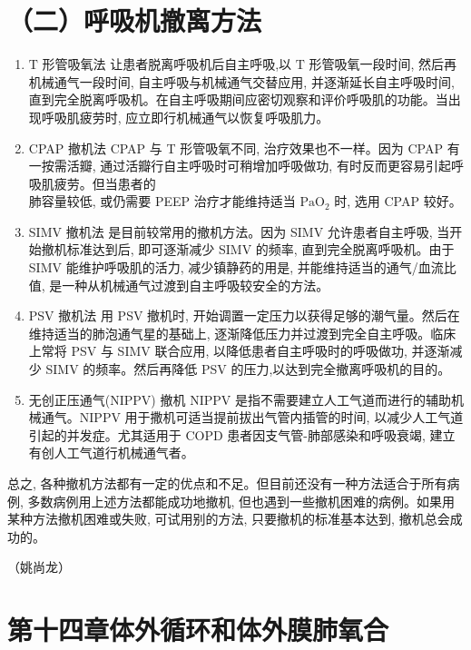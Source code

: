 \documentclass[10pt]{article}
\begin{document}
\section*{（二）呼吸机撤离方法}
\begin{enumerate}
  \item $\mathrm{T}$ 形管吸氧法 让患者脱离呼吸机后自主呼吸,以 $\mathrm{T}$ 形管吸氧一段时间, 然后再机械通气一段时间, 自主呼吸与机械通气交替应用, 并逐渐延长自主呼吸时间, 直到完全脱离呼吸机。在自主呼吸期间应密切观察和评价呼吸肌的功能。当出现呼吸肌疲劳时, 应立即行机械通气以恢复呼吸肌力。

  \item CPAP 撤机法 CPAP 与 T 形管吸氧不同, 治疗效果也不一样。因为 CPAP 有一按需活瓣, 通过活瓣行自主呼吸时可稍增加呼吸做功, 有时反而更容易引起呼吸肌疲劳。但当患者的\\
肺容量较低, 或仍需要 PEEP 治疗才能维持适当 $\mathrm{PaO}_{2}$ 时, 选用 CPAP 较好。

  \item SIMV 撤机法 是目前较常用的撤机方法。因为 SIMV 允许患者自主呼吸, 当开始撤机标准达到后, 即可逐渐减少 SIMV 的频率, 直到完全脱离呼吸机。由于 SIMV 能维护呼吸肌的活力, 减少镇静药的用是, 并能维持适当的通气/血流比值, 是一种从机械通气过渡到自主呼吸较安全的方法。

  \item PSV 撤机法 用 PSV 撤机时, 开始调置一定压力以获得足够的潮气量。然后在维持适当的肺泡通气星的基础上, 逐渐降低压力并过渡到完全自主呼吸。临床上常将 PSV 与 SIMV 联合应用, 以降低患者自主呼吸时的呼吸做功, 并逐渐减少 SIMV 的频率。然后再降低 PSV 的压力,以达到完全撤离呼吸机的目的。

  \item 无创正压通气(NIPPV) 撤机 NIPPV 是指不需要建立人工气道而进行的辅助机械通气。NIPPV 用于撒机可适当提前拔出气管内插管的时间, 以减少人工气道引起的并发症。尤其适用于 COPD 患者因支气管-肺部感染和呼吸衰竭, 建立有创人工气道行机械通气者。

\end{enumerate}

总之, 各种撤机方法都有一定的优点和不足。但目前还没有一种方法适合于所有病例, 多数病例用上述方法都能成功地撤机, 但也遇到一些撤机困难的病例。如果用某种方法撤机困难或失败, 可试用别的方法, 只要撤机的标准基本达到, 撤机总会成功的。

（姚尚龙）

\section*{第十四章体外循环和体外膜肺氧合}
\end{document}
